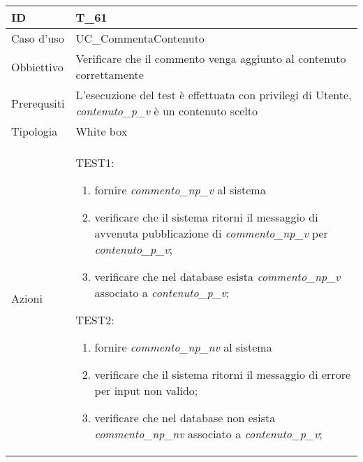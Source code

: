 \begin{table}[hb]
    \centering
    \begin{tabular}{ |p{2cm}|p{10cm}|  }
        \hline
        ID          & T\_61                                                                              \\\hline
        Caso d'uso  & UC\_CommentaContenuto                                                              \\\hline
        Obbiettivo  & Verificare che il commento venga aggiunto al contenuto correttamente               \\\hline
        Prerequsiti & L'esecuzione del test è effettuata con privilegi di Utente, \emph{contenuto\_p\_v}
        è un contenuto scelto                                                                            \\\hline
        Tipologia   & White box                                                                          \\\hline
        Azioni      &
        TEST1:
        \begin{enumerate}[nosep, topsep=0pt]
            \item fornire \emph{commento\_np\_v} al sistema
            \item verificare che il sistema ritorni il messaggio di avvenuta pubblicazione
                  di \emph{commento\_np\_v} per \emph{contenuto\_p\_v};
            \item verificare che nel database esista \emph{commento\_np\_v} associato a
                  \emph{contenuto\_p\_v};
        \end{enumerate}
        \vspace{0.5cm} TEST2:
        \begin{enumerate}[nosep, topsep=0pt]
            \item fornire \emph{commento\_np\_nv} al sistema
            \item verificare che il sistema ritorni il messaggio di errore per input non valido;
            \item verificare che nel database non esista \emph{commento\_np\_nv} associato a
                  \emph{contenuto\_p\_v};
        \end{enumerate}
        \\\hline
    \end{tabular}
\end{table}

